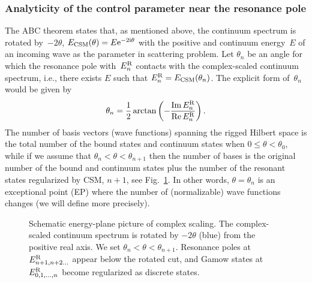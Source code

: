 \subsubsection{Analyticity of the control parameter near the resonance pole}
The ABC theorem states that, as mentioned above, the continuum spectrum is rotated by~$-2\theta$, $E_{\mathrm{CSM}}(\theta) = E \mathrm{e}^{-2\mathrm{i} \theta}$ with the positive and continuum energy~$E$ of an incoming wave as the parameter in scattering problem.
Let $\theta_n$ be an angle for which the resonance pole with~$E^{\mathrm{R}}_n$ contacts with the complex-scaled continuum spectrum, i.e., there exists $E$ such that $E^{\mathrm{R}}_n = E_{\mathrm{CSM}}(\theta_n)$.
The explicit form of~$\theta_n$ would be given by
\begin{align}
    \theta_n = \frac{1}{2} \arctan\left(- \frac{\operatorname{Im} E^{\mathrm{R}}_n}{\operatorname{Re} E^{\mathrm{R}}_n}\right) .
\end{align}
The number of basis vectors (wave functions) spanning the rigged Hilbert space is the total number of the bound states and continuum states when $0\leq\theta<\theta_0$, while if we assume that $\theta_n<\theta<\theta_{n+1}$ then the number of bases is the original number of the bound and continuum states plus the number of the resonant states regularized by CSM, $n+1$, see Fig.~\ref{src:2512_24528:fig:theta_on_E}. In other words, $\theta=\theta_n$ is an exceptional point (EP) where the number of (normalizable) wave functions changes (we will define more precisely).
\begin{figure}[t]
    \centering
{}
    \caption{Schematic energy-plane picture of complex scaling. The complex-scaled continuum spectrum is rotated by $-2\theta$ (blue) from the positive real axis. We set $\theta_n<\theta<\theta_{n+1}$. Resonance poles at $E_{n+1,n+2\dots}^{\mathrm{R}}$ appear below the rotated cut, and Gamow states at $E_{0,1,\dots,n}^{\mathrm{R}}$ become regularized as discrete states.}
    \label{src:2512_24528:fig:theta_on_E}
\end{figure}
